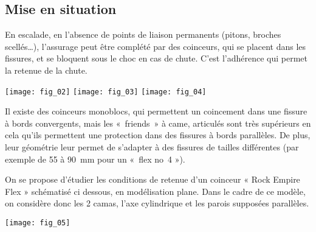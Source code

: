 
\subsection*{Mise en situation}

En escalade, en l’absence de points de liaison permanents (pitons, broches scellés…), l’assurage peut être complété par des coinceurs, qui se placent dans les fissures, et se bloquent sous le choc en cas de chute. C’est l’adhérence qui permet la retenue de la chute.
\begin{center}
\texttt{[image: fig\_02]}
\texttt{[image: fig\_03]}
\texttt{[image: fig\_04]}
\end{center}
Il existe des coinceurs monoblocs, qui permettent un coincement dans une fissure à bords convergents, mais les 
«~friends~» à came, articulés sont très supérieurs en cela qu’ils permettent une protection dans des fissures à bords parallèles. De plus, leur géométrie leur permet de s’adapter à des fissures de tailles différentes (par exemple de 55 à \SI{90}{mm} pour un «~flex no~4 »).

On se propose d’étudier les conditions de retenue d’un coinceur « Rock Empire Flex » schématisé ci dessous, en modélisation plane. Dans le cadre de ce modèle, on considère donc les 2 camas, l'axe cylindrique et les parois supposées parallèles. 


\begin{center}
\texttt{[image: fig\_05]}
\end{center}

\ifprof
\begin{corrige}~\\
\end{corrige}
\else
\fi


\ifprof
\begin{corrige}~\\
\end{corrige}
\else
\fi

